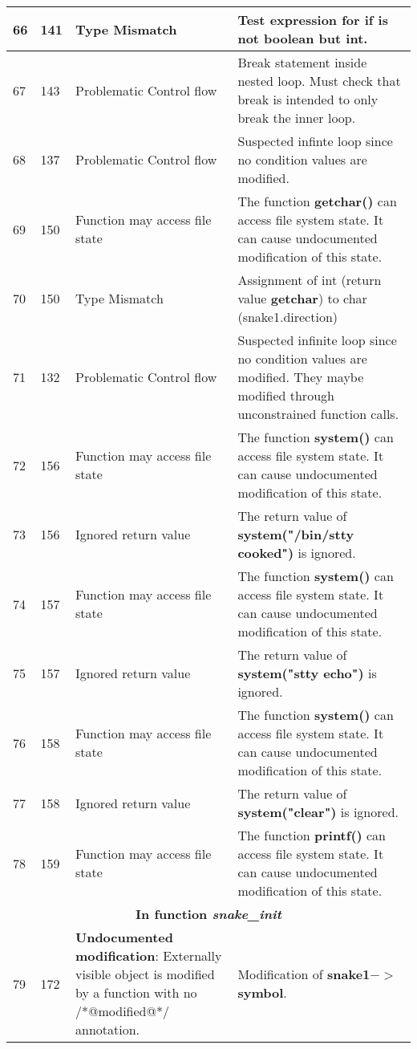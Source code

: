 \documentclass[]{article}
\begin{document}
\begin{longtable}{ |p{0.5cm}|p{0.75cm}|p{3cm}|p{9cm}|  }
		66 & 141 & Type Mismatch & Test expression for \textbf{if} is not boolean but int. \\ 
		\hline    
		67 & 143 & Problematic Control flow & Break statement inside nested loop. Must check that break is intended to only break the inner loop. \\
		\hline    
		68 & 137 & Problematic Control flow & Suspected infinte loop since no condition values are modified. \\
		\hline    
		69 & 150 & Function may access file state & The function \textbf{getchar()} can access file system state. It can cause undocumented modification of this state. \\
		\hline    
		70 & 150 & Type Mismatch & Assignment of int (return value \textbf{getchar}) to char (snake1.direction) \\
		\hline    
		71 & 132 & Problematic Control flow & Suspected infinite loop since no condition values are modified. They maybe modified through unconstrained function calls. \\
		\hline    
		72 & 156 & Function may access file state & The function \textbf{system()} can access file system state. It can cause undocumented modification of this state. \\
		\hline    
		73 & 156 & Ignored return value & The return value of \textbf{system("/bin/stty cooked")} is ignored. \\
		\hline    
		74 & 157 & Function may access file state & The function \textbf{system()} can access file system state. It can cause undocumented modification of this state. \\
		\hline    
		75 & 157 & Ignored return value & The return value of \textbf{system("stty echo")} is ignored. \\
		\hline    
		76 & 158 & Function may access file state & The function \textbf{system()} can access file system state. It can cause undocumented modification of this state. \\
		\hline    
		77 & 158 & Ignored return value & The return value of \textbf{system("clear")} is ignored. \\
		\hline    
		78 & 159 & Function may access file state & The function \textbf{printf()} can access file system state. It can cause undocumented modification of this state. \\
		\hline    
		\multicolumn{4}{|c|}{\textbf{In function \textit{snake\_init}}} \\
		\hline 
		79 & 172 & \multirow{8}{90.0pt}{\textbf{Undocumented modification}: Externally visible object is modified by a function with no /*@modified@*/ annotation.} & Modification of \textbf{snake1$->$symbol}.  \\

\end{longtable}
\end{document}
